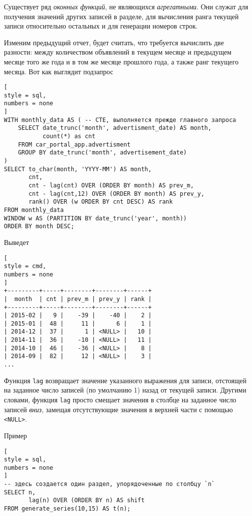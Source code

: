 \documentclass[%
	11pt,
	a4paper,
	utf8,
		]{article}
\begin{document}

Существует ряд \emph{оконных функций}, не являющихся \emph{агрегатными}. Они служат для получения значений других записей в разделе, для вычисления ранга текущей записи относительно остальных и для генерации номеров строк.

Изменим предыдущий отчет, будет считать, что требуется вычислить две разности: между количеством объявлений в текущем месяце и предыдущем месяце того же года и в том же месяце прошлого года, а также ранг текущего месяца. Вот как выглядит подзапрос
\begin{lstlisting}[
style = sql,
numbers = none
]
WITH monthly_data AS ( -- CTE, выполняется прежде главного запроса
    SELECT date_trunc('month', advertisment_date) AS month,
           count(*) as cnt
    FROM car_portal_app.advertisment
    GROUP BY date_trunc('month', advertisement_date)
)
SELECT to_char(month, 'YYYY-MM') AS month,
       cnt,
       cnt - lag(cnt) OVER (ORDER BY month) AS prev_m,
       cnt - lag(cnt,12) OVER (ORDER BY month) AS prev_y,
       rank() OVER (w ORDER BY cnt DESC) AS rank
FROM monthly_data
WINDOW w AS (PARTITION BY date_trunc('year', month))
ORDER BY month DESC;
\end{lstlisting}

Выведет
\begin{lstlisting}[
style = cmd,
numbers = none
]
+---------+-----+--------+--------+------+
|  month  | cnt | prev_m | prev_y | rank |
+---------+-----+--------+--------+------+
| 2015-02 |   9 |    -39 |    -40 |    2 |
| 2015-01 |  48 |     11 |      6 |    1 |
| 2014-12 |  37 |      1 | <NULL> |   10 |
| 2014-11 |  36 |    -10 | <NULL> |   11 |
| 2014-10 |  46 |    -36 | <NULL> |    8 |
| 2014-09 |  82 |     12 | <NULL> |    3 |
...
\end{lstlisting}

Функция \texttt{lag} возвращает значение указанного выражения для записи, отстоящей на заданное число записей (по умолчанию 1) назад от текущей записи. Другими словами, функция \texttt{lag} просто смещает значения в столбце на заданное число записей \emph{вниз}, замещая отсутствующие значения в верхней части с помощью \texttt{<NULL>}.

Пример
\begin{lstlisting}[
style = sql,
numbers = none
]
-- здесь создается один раздел, упорядоченные по столбцу `n`
SELECT n,
       lag(n) OVER (ORDER BY n) AS shift
FROM generate_series(10,15) AS t(n);
\end{lstlisting}
\end{document}
